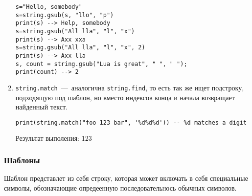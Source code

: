 \begin{enumerate}
\begin{lstlisting}
s="Hello, somebody"
s=string.gsub(s, "llo", "p")
print(s) --> Help, somebody
s=string.gsub("All lla", "l", "x")
print(s) --> Axx xxa
s=string.gsub("All lla", "l", "x", 2)
print(s) --> Axx lla
s, count = string.gsub("Lua is great", " ", " ");
print(count) --> 2
\end{lstlisting}
	
	\item \lstinline{string.match}~---~аналогична \lstinline{string.find}, то есть так же ищет подстроку, подходящую под шаблон, но вместо индексов конца и начала возвращает найденный текст. 
	
\begin{lstlisting}
print(string.match("foo 123 bar", '%d%d%d')) -- %d matches a digit
\end{lstlisting}

Результат выполения:
123

\end{enumerate} 

\subsubsection{Шаблоны}
Шаблон представлет из себя строку, которая может включать в себя специальные символы, обозначающие опредеенную последовательнось обычных символов. 

